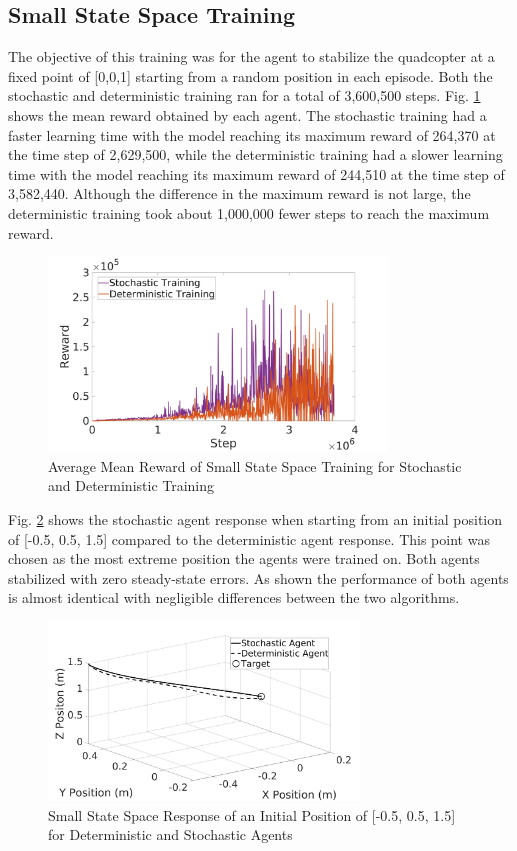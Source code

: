\subsection{Small State Space Training}
The objective of this training was for the agent to stabilize the quadcopter at a fixed point of [0,0,1] starting from a random position in each episode. Both the stochastic and deterministic training ran for a total of 3,600,500 steps. Fig. \ref{SvT0.5} shows the mean reward obtained by each agent. The stochastic training had a faster learning time with the model reaching its maximum reward of 264,370 at the time step of 2,629,500, while the deterministic training had a slower learning time with the model reaching its maximum reward of 244,510 at the time step of 3,582,440. Although the difference in the maximum reward is not large, the deterministic training took about 1,000,000 fewer steps to reach the maximum reward.
\begin{figure}[H]
\centerline{\includegraphics[width=0.8\textwidth]{plots/SACvsTD30_5.jpg}}
\caption{Average Mean Reward of Small State Space Training for Stochastic and Deterministic Training}
\label{SvT0.5}
\end{figure}
Fig. \ref{x0.5} shows the stochastic agent response when starting from an initial position of [-0.5, 0.5, 1.5] compared to the deterministic agent response. This point was chosen as the most extreme position the agents were trained on. Both agents stabilized with zero steady-state errors. As shown the performance of both agents is almost identical with negligible differences between the two algorithms.
\begin{figure}[H]
            \centerline{\includegraphics[width=0.735\textwidth]{plots/0_5_1.jpg}}
            \caption{Small State Space Response of an Initial Position of [-0.5, 0.5, 1.5] for Deterministic and Stochastic Agents}
            \label{x0.5}
    \end{figure}\clearpage
